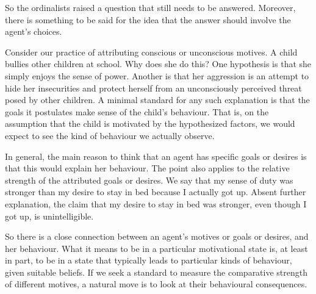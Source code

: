 So the ordinalists raised a question that still needs to be answered.
Moreover, there is something to be said for the idea that the answer
should involve the agent's choices.

Consider our practice of attributing conscious or unconscious
motives. A child bullies other children at school. Why does she do
this? One hypothesis is that she simply enjoys the sense of
power. Another is that her aggression is an attempt to hide her
insecurities and protect herself from an unconsciously perceived
threat posed by  other children. A minimal standard for any such
explanation is that the goals it postulates make sense of the child's
behaviour. That is, on the assumption that the child is motivated by
the hypothesized factors, we would expect to see the kind of behaviour
we actually observe.

In general, the main reason to think that an agent has specific goals
or desires is that this would explain her behaviour. The point also
applies to the relative strength of the attributed goals or
desires. We say that my sense of duty was stronger than my desire to
stay in bed because I actually got up. Absent further explanation, the
claim that my desire to stay in bed was stronger, even though
I got up, is unintelligible.

So there is a close connection between an agent's motives or goals or
desires, and her behaviour. What it means to be in a particular
motivational state is, at least in part, to be in a state that
typically leads to particular kinds of behaviour, given suitable
beliefs. If we seek a standard to measure the comparative strength of
different motives, a natural move is to look at their
behavioural consequences.



